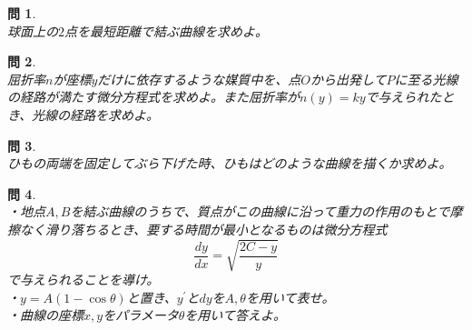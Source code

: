 \documentclass{jsarticle}
\newtheorem{pro}{問}[section]
\begin{document}
\begin{pro}~\\
球面上の\(2\)点を最短距離で結ぶ曲線を求めよ。
\end{pro}

\begin{pro}~\\
屈折率\(n\)が座標\(y\)だけに依存するような媒質中を、点\(O\)から出発して\(P\)に至る光線の経路が満たす微分方程式を求めよ。また屈折率が\(n(y)=ky\)で与えられたとき、光線の経路を求めよ。
\end{pro}

\begin{pro}~\\
ひもの両端を固定してぶら下げた時、ひもはどのような曲線を描くか求めよ。
\end{pro}

\begin{pro}~\\
・地点\(A,B\)を結ぶ曲線のうちで、質点がこの曲線に沿って重力の作用のもとで摩擦なく滑り落ちるとき、要する時間が最小となるものは微分方程式
\[\frac{dy}{dx}=\sqrt{\frac{2C-y}{y}}\]
で与えられることを導け。\\
・\(y=A(1-\cos\theta)\)と置き、\(y^{\prime}\)と\(dy\)を\(A,\theta\)を用いて表せ。\\
・曲線の座標\(x,y\)をパラメータ\(\theta\)を用いて答えよ。
\end{pro}
\end{document}
